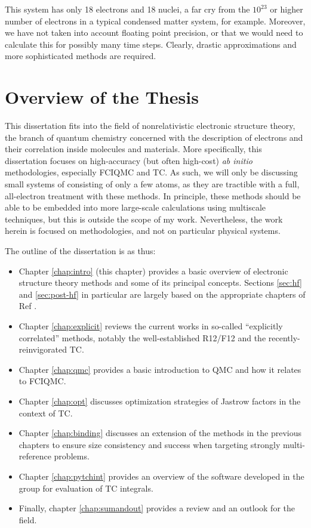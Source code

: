 This system has only 18 electrons and 18 nuclei, a far cry from the $10^{23}$ or higher number of electrons in a typical condensed matter system, for example. Moreover, we have not taken into account floating point precision, or that we would need to calculate this for possibly many time steps. Clearly, drastic approximations and more sophisticated methods are required.

\section{Overview of the Thesis}

This dissertation fits into the field of nonrelativistic electronic structure theory, the branch of quantum chemistry concerned with the description of electrons and their correlation inside molecules and materials. More specifically, this dissertation focuses on high-accuracy (but often high-cost) \emph{ab initio} methodologies, especially \gls{FCIQMC} and \gls{TC}. As such, we will only be discussing small systems of consisting of only a few atoms, as they are tractible with a full, all-electron treatment with these methods. In principle, these methods should be able to be embedded \cite{jonesEmbedding2020,christlmaierFull2022} into more large-scale calculations using multiscale techniques, but this is outside the scope of my work. Nevertheless, the work herein is focused on methodologies, and not on particular physical systems.

The outline of the dissertation is as thus:
\begin{itemize}
    \item Chapter \ref{chap:intro} (this chapter) provides a basic overview of electronic structure theory methods and some of its principal concepts. Sections \ref{sec:hf} and \ref{sec:post-hf} in particular are largely based on the appropriate chapters of Ref .
    \item Chapter \ref{chap:explicit} reviews the current works in so-called ``explicitly correlated'' methods, notably the well-established R12/F12 and the recently-reinvigorated \gls{TC}.
    \item Chapter \ref{chap:qmc} provides a basic introduction to \gls{QMC} and how it relates to \gls{FCIQMC}.
    \item Chapter \ref{chap:opt} discusses optimization strategies of Jastrow factors in the context of \gls{TC}.
    \item Chapter \ref{chap:binding} discusses an extension of the methods in the previous chapters to ensure size consistency and success when targeting strongly multi-reference problems.
    \item Chapter \ref{chap:pytchint} provides an overview of the software \pytchint developed in the group for evaluation of \gls{TC} integrals.
    \item Finally, chapter \ref{chap:sumandout} provides a review and an outlook for the field.
\end{itemize}


